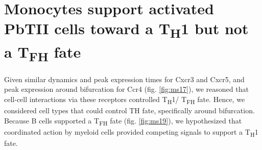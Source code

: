 \section{Monocytes support activated PbTII cells toward a \texorpdfstring{T\textsubscript{H}1 but not a T\textsubscript{FH}}{TH1 but not a TFH} fate}

Given similar dynamics and peak expression times for Cxcr3 and Cxcr5, and peak expression around bifurcation for Ccr4 (fig. \ref{fig:ms17}), we reasoned that cell-cell interactions via these receptors controlled T\textsubscript{H}1/ T\textsubscript{FH} fate. Hence, we considered cell types that could control TH fate, specifically around bifurcation. Because B cells supported a T\textsubscript{FH} fate (fig. \ref{fig:ms19}), we hypothesized that coordinated action by myeloid cells provided competing signals to support a T\textsubscript{H}1 fate.

